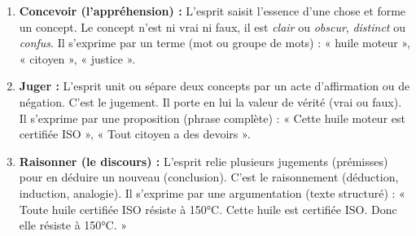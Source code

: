 \documentclass[11pt]{article}
\newcommand{\cle}[1]{{\popxbold\color{popdark}#1}}
\begin{document}
\begin{enumerate}
    \item \textbf{Concevoir (l'appréhension) :} L'esprit saisit l'essence d'une chose et forme un \cle{concept}. Le concept n'est ni vrai ni faux, il est \emph{clair} ou \emph{obscur}, \emph{distinct} ou \emph{confus}. Il s'exprime par un \cle{terme} (mot ou groupe de mots) : « huile moteur », « citoyen », « justice ».
    \item \textbf{Juger :} L'esprit unit ou sépare deux concepts par un acte d'affirmation ou de négation. C'est le \cle{jugement}. Il porte en lui la \cle{valeur de vérité} (vrai ou faux). Il s'exprime par une \cle{proposition} (phrase complète) : « Cette huile moteur est certifiée ISO », « Tout citoyen a des devoirs ».
    \item \textbf{Raisonner (le discours) :} L'esprit relie plusieurs jugements (prémisses) pour en déduire un nouveau (conclusion). C'est le \cle{raisonnement} (déduction, induction, analogie). Il s'exprime par une \cle{argumentation} (texte structuré) : « Toute huile certifiée ISO résiste à 150°C. Cette huile est certifiée ISO. Donc elle résiste à 150°C. »
\end{enumerate}
\end{document}
